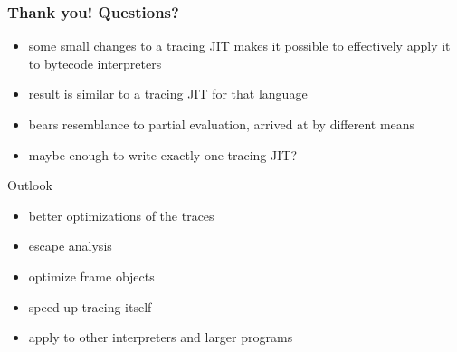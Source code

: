\documentclass[utf8x]{beamer}
\begin{document}
\begin{frame}
    \frametitle{Thank you! Questions?}
    \begin{itemize}
    \item some small changes to a tracing JIT makes it possible to effectively apply it to bytecode interpreters
    \item result is similar to a tracing JIT for that language
    \item bears resemblance to partial evaluation, arrived at by different means
    \item maybe enough to write exactly one tracing JIT?
    \end{itemize}
    \begin{block}{Outlook}
        \begin{itemize}
        \item better optimizations of the traces
        \item escape analysis
        \item optimize frame objects
        \item speed up tracing itself
        \item apply to other interpreters and larger programs
        \end{itemize}
    \end{block}
\end{frame}
\end{document}
